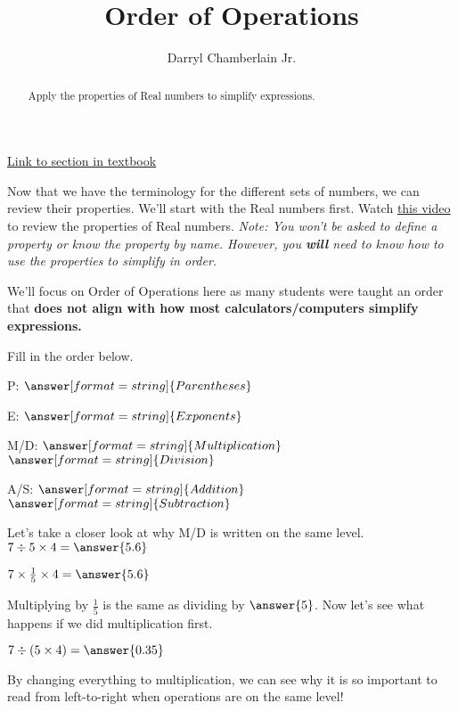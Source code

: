 \documentclass{ximera}
\author{Darryl Chamberlain Jr.}
\title{Order of Operations}
\begin{document}
\begin{abstract}
Apply the properties of Real numbers to simplify expressions. 
\end{abstract}
\maketitle

\href{https://cnx.org/contents/mwjClAV_@8.1:0KhpF2RH@23/Real-Numbers-Algebra-Essentials}{Link to section in textbook}


Now that we have the terminology for the different sets of numbers, we can review their properties. We'll start with the Real numbers first. Watch \href{https://mediasite.video.ufl.edu/Mediasite/Play/adc9e0878901450db891a5b46b383bf01d}{this video} to review the properties of Real numbers. \textit{Note: You won't be asked to define a property or know the property by name. However, you \textbf{will} need to know how to use the properties to simplify in order.}

We'll focus on Order of Operations here as many students were taught an order that \textbf{does not align with how most calculators/computers simplify expressions.}

\begin{question}
Fill in the order below.

P: $\answer[format=string]{Parentheses}$

E: $\answer[format=string]{Exponents}$

M/D: $\answer[format=string]{Multiplication}$ \ $\answer[format=string]{Division}$

A/S: $\answer[format=string]{Addition}$ \ $\answer[format=string]{Subtraction}$
\end{question}

\begin{question}
Let's take a closer look at why M/D is written on the same level. 
$7 \div 5 \times 4 = \answer{5.6}$

$7 \times \frac{1}{5} \times 4 = \answer{5.6}$

Multiplying by $\frac{1}{5}$ is the same as dividing by $\answer{5}$. Now let's see what happens if we did multiplication first. 

$7 \div (5 \times 4) = \answer{0.35}$

By changing everything to multiplication, we can see why it is so important to read from left-to-right when operations are on the same level! 
\end{question}
\end{document}
